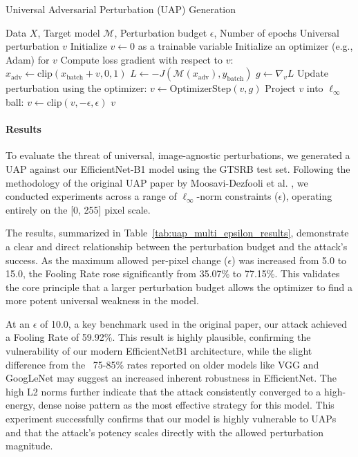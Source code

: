 \documentclass[../main.tex]{subfiles}
\begin{document}
\begin{breakablealgorithm}{Universal Adversarial Perturbation (UAP) Generation}
\begin{algorithmic}[1]
\Require Data $X$, Target model $\mathcal{M}$, Perturbation budget $\epsilon$, Number of epochs
\Ensure Universal perturbation $v$
\State Initialize $v \gets 0$ as a trainable variable
\State Initialize an optimizer (e.g., Adam) for $v$
        \State Compute loss gradient with respect to $v$:
        \State \quad $x_{\mathrm{adv}} \gets \text{clip}(x_{\mathrm{batch}} + v, 0, 1)$
        \State \quad $L \gets -J(\mathcal{M}(x_{\mathrm{adv}}), y_{\mathrm{batch}})$ 
        \State \quad $g \gets \nabla_v L$
        \State Update perturbation using the optimizer: $v \gets \text{OptimizerStep}(v, g)$
        \State Project $v$ into $\ell_\infty$ ball: $v \gets \text{clip}(v, -\epsilon, \epsilon)$
    \EndFor
\EndFor
\State \Return $v$
\end{algorithmic}
\end{breakablealgorithm}

\paragraph{Results}
To evaluate the threat of universal, image-agnostic perturbations, we generated a UAP against our EfficientNet-B1 model using the GTSRB test set. Following the methodology of the original UAP paper by Moosavi-Dezfooli et al. \cite{moosavidezfooli2017universaladversarialperturbations}, we conducted experiments across a range of $\ell_\infty$-norm constraints ($\epsilon$), operating entirely on the [0, 255] pixel scale.

The results, summarized in Table~\ref{tab:uap_multi_epsilon_results}, demonstrate a clear and direct relationship between the perturbation budget and the attack's success. As the maximum allowed per-pixel change ($\epsilon$) was increased from 5.0 to 15.0, the Fooling Rate rose significantly from 35.07\% to 77.15\%. This validates the core principle that a larger perturbation budget allows the optimizer to find a more potent universal weakness in the model.

At an $\epsilon$ of 10.0, a key benchmark used in the original paper, our attack achieved a Fooling Rate of 59.92\%. This result is highly plausible, confirming the vulnerability of our modern EfficientNetB1 architecture, while the slight difference from the ~75-85\% rates reported on older models like VGG and GoogLeNet may suggest an increased inherent robustness in EfficientNet. The high L2 norms further indicate that the attack consistently converged to a high-energy, dense noise pattern as the most effective strategy for this model. This experiment successfully confirms that our model is highly vulnerable to UAPs and that the attack's potency scales directly with the allowed perturbation magnitude.
\end{document}
